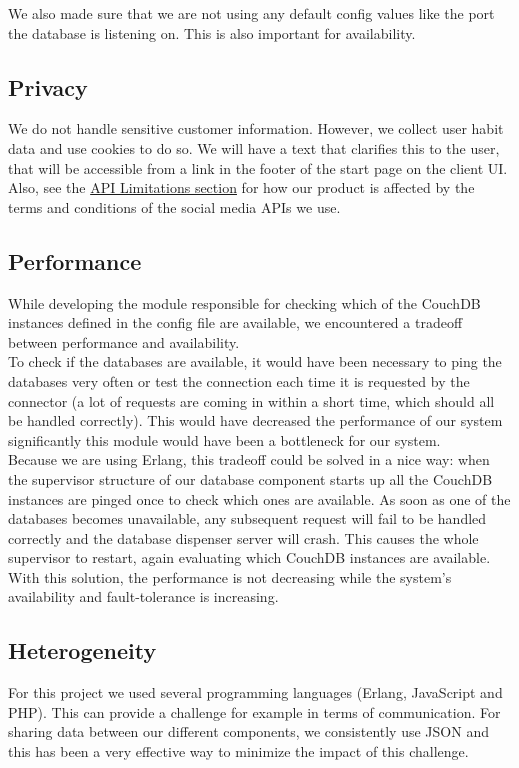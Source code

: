We also made sure that we are not using any default config values like the port
the database is listening on. This is also important for availability.

\subsection{Privacy}
We do not handle sensitive customer information. However, we collect user habit
data and use cookies to do so. We will have a text that clarifies this to the
user, that will be accessible from a link in the footer of the start page on the
client UI. \\

Also, see the \hyperlink{apilimits}{API Limitations section} for how our product
is affected by the terms and conditions of the social media APIs we use.

\subsection{Performance}
While developing the module responsible for checking which of the CouchDB
instances defined in the config file are available, we encountered a tradeoff
between performance and availability. \\

To check if the databases are available, it would have been necessary to ping
the databases very often or test the connection each time it is requested by
the connector (a lot of requests are coming in within a short time, which should
all be handled correctly). This would have decreased the performance of our
system significantly this module would have been a bottleneck for our system.
\\

Because we are using Erlang, this tradeoff could be solved in a nice way: when
the supervisor structure of our database component starts up all the CouchDB
instances are pinged once to check which ones are available. As soon as one of
the databases becomes unavailable, any subsequent request will fail to be
handled correctly and the database dispenser server will crash. This causes the
whole supervisor to restart, again evaluating which CouchDB instances are
available. With this solution, the performance is not decreasing while the
system's availability and fault-tolerance is increasing.

\subsection{Heterogeneity}
For this project we used several programming languages (Erlang, JavaScript and
PHP). This can provide a challenge for example in terms of communication. For
sharing data between our different components, we consistently use JSON and this
has been a very effective way to minimize the impact of this challenge.

